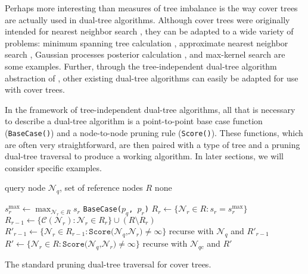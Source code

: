 Perhaps more interesting than measures of tree imbalance is the way cover trees
are actually used in dual-tree algorithms.  Although cover trees were originally
intended for nearest neighbor search \citep[See Algorithm
\texttt{Find-All-Nearest},][]{langford2006}, they can be adapted to a wide
variety of problems: minimum
spanning tree calculation \citep{march2010euclidean}, approximate nearest neighbor
search \citep{ram2009rank}, Gaussian processes posterior calculation
\citep{moore2014fast}, and max-kernel search \citep{curtin2014dual} are some
examples.  Further, through the tree-independent dual-tree algorithm abstraction
of \citet{curtin2013tree}, other existing dual-tree algorithms can easily be
adapted for use with cover trees.

In the framework of tree-independent dual-tree algorithms, all that is necessary
to describe a dual-tree algorithm is a point-to-point base case function
(\texttt{BaseCase()}) and a node-to-node pruning rule (\texttt{Score()}).  These
functions, which are often very straightforward, are then paired with a type of
tree and a pruning dual-tree traversal to produce a working algorithm.  In later
sections, we will consider specific examples.

\begin{algorithm}[tb]
  \begin{algorithmic}[1]
     query node $\mathscr{N}_q$, set of reference nodes
$R$ \label{alg:line:ct-dual-input}
     none

    \medskip
    \STATE $s^{\max}_r \gets \max_{\mathscr{N}_r \in R} s_r$
\label{alg:line:ct-dual-srmax}
     \label{alg:line:ct-dual-ref-recursion-start}
      \STATE {}
       \label{alg:line:ct-dual-base-case-start}
        \STATE \texttt{BaseCase($p_q$, $p_r$)}
      \ENDFOR \label{alg:line:ct-dual-base-case-end}
      \STATE $R_r \gets \{ \mathscr{N}_r \in R : s_r = s^{\max}_r \}$
\label{alg:line:ct-dual-ref-set}
      \STATE $R_{r - 1} \gets \{ \mathscr{C}(\mathscr{N}_r) : \mathscr{N}_r \in
R_r \} \cup (R \setminus R_r)$ \label{alg:line:ct-dual-ref-children}
      \STATE $R'_{r - 1} \gets \{ \mathscr{N}_r \in R_{r - 1} :
\texttt{Score(}\mathscr{N}_q\texttt{,} \mathscr{N}_r\texttt{)} \ne \infty \}$
\label{alg:line:ct-dual-ref-score}
      \STATE recurse with $\mathscr{N}_q$ and $R'_{r - 1}$
\label{alg:line:ct-dual-ref-recursion-end}
    \ELSE \label{alg:line:ct-dual-query-recursion-start}
      \STATE {}
        \STATE $R' \gets \{ \mathscr{N}_r \in R :
\texttt{Score(}\mathscr{N}_q\texttt{,} \mathscr{N}_r\texttt{)} \ne \infty \}$
\label{alg:line:ct-dual-query-pruning}
        \STATE recurse with $\mathscr{N}_{qc}$ and $R'$
\label{alg:line:ct-dual-query-recursion}
      \ENDFOR \label{alg:line:ct-dual-query-recursion-end}
    \ENDIF
  \end{algorithmic}
  \caption{The standard pruning dual-tree traversal for cover trees.}
  \label{alg:cover-tree-dual}
\end{algorithm}

